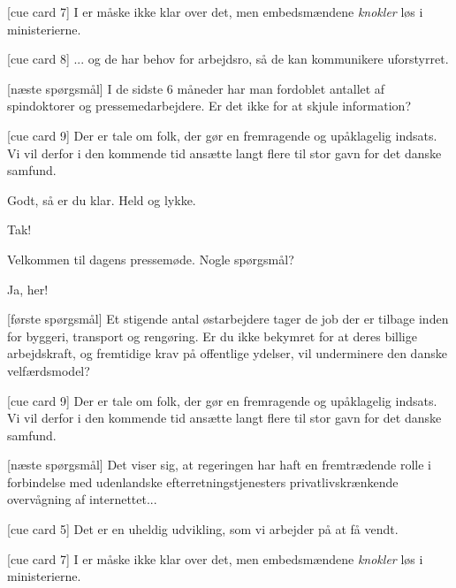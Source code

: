\documentclass[a4paper,11pt]{article}
\begin{document}
\begin{sketch}
[cue card 7] I er måske ikke klar over det, men embedsmændene \emph{knokler} løs i ministerierne.

[cue card 8] ... og de har behov for arbejdsro, så de kan kommunikere uforstyrret.

[næste spørgsmål] I de sidste 6 måneder har man fordoblet antallet af spindoktorer og pressemedarbejdere. Er det ikke for at skjule information?

[cue card 9] Der er tale om folk, der gør en fremragende og upåklagelig indsats. Vi vil derfor i den kommende tid ansætte langt flere til stor gavn for det danske samfund.

 Godt, så er du klar. Held og lykke.




 Tak!

 Velkommen til dagens pressemøde. Nogle spørgsmål?


 Ja, her!

[første spørgsmål] Et stigende antal østarbejdere tager de job der er tilbage inden for byggeri, transport og rengøring. Er du ikke bekymret for at deres billige arbejdskraft, og fremtidige krav på offentlige ydelser, vil underminere den danske velfærdsmodel?

[cue card 9] Der er tale om folk, der gør en fremragende og upåklagelig indsats. Vi vil derfor i den kommende tid ansætte langt flere til stor gavn for det danske samfund.


[næste spørgsmål] Det viser sig, at regeringen har haft en fremtrædende rolle i forbindelse med udenlandske efterretningstjenesters privatlivskrænkende overvågning af internettet...

[cue card 5] Det er en uheldig udvikling, som vi arbejder på at få vendt.

[cue card 7] I er måske ikke klar over det, men embedsmændene \emph{knokler} løs i ministerierne.


\end{sketch}
\end{document}
